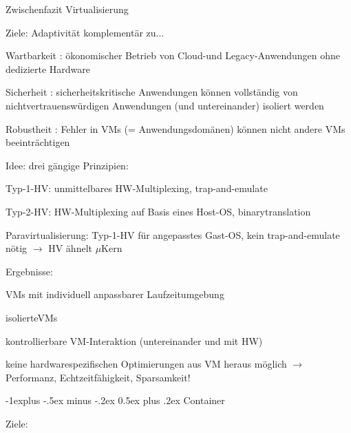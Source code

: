\documentclass[a4paper]{article}
\makeatletter
\newcommand{\cmark}{\ding{51}}
\newcommand{\xmark}{\ding{55}}
\renewcommand{\subsection}{\@startsection{subsection}{2}{0mm}%
 {-1explus -.5ex minus -.2ex}%
 {0.5ex plus .2ex}%
 {\normalfont\normalsize\bfseries}}
\makeatother
\begin{document}
\begin{multicols}{3}
    Zwischenfazit Virtualisierung

    \begin{itemize*}
        \item
        Ziele: Adaptivität komplementär zu...
        \begin{itemize*}
            \item Wartbarkeit : ökonomischer Betrieb von Cloud-und Legacy-Anwendungen ohne dedizierte Hardware
            \item Sicherheit : sicherheitskritische Anwendungen können vollständig von nichtvertrauenswürdigen Anwendungen (und untereinander) isoliert werden
            \item Robustheit : Fehler in VMs (= Anwendungsdomänen) können nicht andere VMs beeinträchtigen
        \end{itemize*}
        \item
        Idee: drei gängige Prinzipien:
        \begin{itemize*}
            \item Typ-1-HV: unmittelbares HW-Multiplexing, trap-and-emulate
            \item Typ-2-HV: HW-Multiplexing auf Basis eines Host-OS, binarytranslation
            \item Paravirtualisierung: Typ-1-HV für angepasstes Gast-OS, kein trap-and-emulate nötig $\rightarrow$ HV ähnelt $\mu$Kern
        \end{itemize*}
        \item
        Ergebnisse:
        \begin{itemize*}
            \item \cmark VMs mit individuell anpassbarer Laufzeitumgebung
            \item \cmark isolierteVMs
            \item \cmark kontrollierbare VM-Interaktion (untereinander und mit HW)
            \item \xmark keine hardwarespezifischen Optimierungen aus VM heraus möglich $\rightarrow$ Performanz, Echtzeitfähigkeit, Sparsamkeit!
        \end{itemize*}
    \end{itemize*}


    \subsection{Container}

    Ziele:


\end{multicols}
\end{document}
